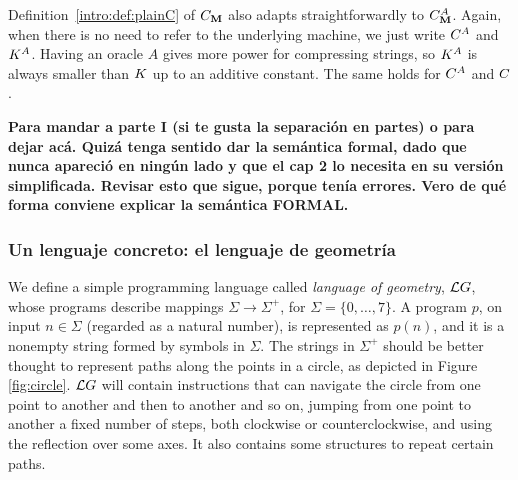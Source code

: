 Definition~\ref{intro:def:plainC} of $C_{{\bf M}}$ also adapts
straightforwardly to $C_{{\bf M}}^A$. Again, when there
is no need to refer to the underlying \opt machine, we just write
$C^A$ and $K^A$. Having an
oracle $A$ gives more power for compressing strings, so $K^A$ is
always smaller than $K$ up to an additive constant. The same
holds for $C^A$ and $C$.




\color{blue}
{\bf Para mandar a parte I (si te gusta la separación en partes) o para dejar acá. Quizá tenga sentido dar la semántica formal, dado que nunca apareció en ningún lado y que el cap 2 lo necesita en su versión simplificada. Revisar esto que sigue, porque tenía errores. Vero de qué forma conviene explicar la semántica FORMAL.}

\subsubsection{Un lenguaje concreto: el lenguaje de geometría}


We define a simple programming language called {\em language of geometry}, $\mathcal{L}G$, whose programs describe mappings $\Sigma\to\Sigma^+$, for $\Sigma=\{0,\dots,7\}$.
A program $p$, on input $n\in\Sigma$ (regarded as a natural number), is represented as $p(n)$, and it is a nonempty string formed by symbols in $\Sigma$. The strings in $\Sigma^+$ should be better thought to represent paths along the points in a circle, as depicted in Figure \ref{fig:circle}. $\mathcal{L}G$ will contain instructions that can navigate the circle from one point to another and then to another and so on, jumping from one point to another a fixed number of steps, both clockwise or counterclockwise, and using the reflection over some axes. It also contains some structures to repeat certain paths.


